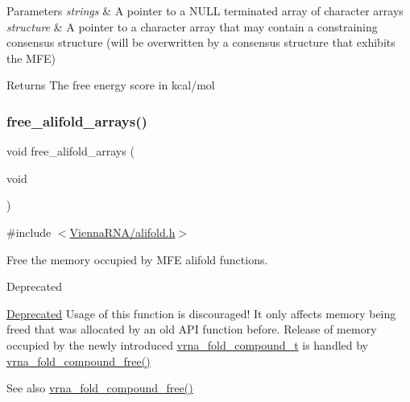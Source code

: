 \begin{DoxyParams}{Parameters}
{\em strings} & A pointer to a N\+U\+LL terminated array of character arrays \\
\hline
{\em structure} & A pointer to a character array that may contain a constraining consensus structure (will be overwritten by a consensus structure that exhibits the M\+FE) \\
\hline
\end{DoxyParams}
\begin{DoxyReturn}{Returns}
The free energy score in kcal/mol 
\end{DoxyReturn}
\mbox{\label{group__mfe__global__deprecated_ga72095e4554b5d577250ea14c42acc49e}} 
\subsubsection{\texorpdfstring{free\_alifold\_arrays()}{free\_alifold\_arrays()}}
{\footnotesize\ttfamily void free\+\_\+alifold\+\_\+arrays (\begin{DoxyParamCaption}\item[{void}]{ }\end{DoxyParamCaption})}



{\ttfamily \#include $<$\mbox{\hyperlink{alifold_8h}{Vienna\+R\+N\+A/alifold.\+h}}$>$}



Free the memory occupied by M\+FE alifold functions. 

\begin{DoxyRefDesc}{Deprecated}
\item[\mbox{\hyperlink{deprecated__deprecated000014}{Deprecated}}]Usage of this function is discouraged! It only affects memory being free\textquotesingle{}d that was allocated by an old A\+PI function before. Release of memory occupied by the newly introduced \mbox{\hyperlink{group__fold__compound_ga1b0cef17fd40466cef5968eaeeff6166}{vrna\+\_\+fold\+\_\+compound\+\_\+t}} is handled by \mbox{\hyperlink{group__fold__compound_ga576a077b418a9c3650e06f8e5d296fc2}{vrna\+\_\+fold\+\_\+compound\+\_\+free()}}\end{DoxyRefDesc}


\begin{DoxySeeAlso}{See also}
\mbox{\hyperlink{group__fold__compound_ga576a077b418a9c3650e06f8e5d296fc2}{vrna\+\_\+fold\+\_\+compound\+\_\+free()}} 
\end{DoxySeeAlso}

